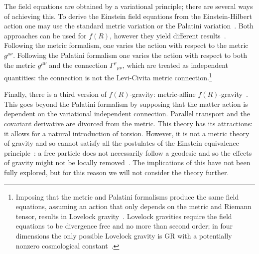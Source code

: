 \documentclass[aps,prd,amsfonts,amssymb,amsmath,nofootinbib,reprint,showpacs]{revtex4-1}
\begin{document}
The field equations are obtained by a variational principle; there are several ways of achieving this. To derive the Einstein field equations from the Einstein-Hilbert action one may use the standard metric variation or the Palatini variation~\cite{Misner1973}. Both approaches can be used for $f(R)$, however they yield different results~\cite{Sotiriou2010, DeFelice2010}. Following the metric formalism, one varies the action with respect to the metric $g^{\mu\nu}$. Following the Palatini formalism one varies the action with respect to both the metric $g^{\mu\nu}$ and the connection ${\Gamma^\rho}_{\mu\nu}$, which are treated as independent quantities: the connection is not the Levi-Civita metric connection.\footnote{Imposing that the metric and Palatini formalisms produce the same field equations, assuming an action that only depends on the metric and Riemann tensor, results in Lovelock gravity~\cite{Exirifard2008}. Lovelock gravities require the field equations to be divergence free and no more than second order; in four dimensions the only possible Lovelock gravity is GR with a potentially nonzero cosmological constant~\cite{Lovelock1970, Lovelock1971, Lovelock1972}.}

Finally, there is a third version of $f(R)$-gravity: metric-affine $f(R)$-gravity~\cite{Sotiriou2007, Sotiriou2007b}. This goes beyond the Palatini formalism by supposing that the matter action is dependent on the variational independent connection. Parallel transport and the covariant derivative are divorced from the metric. This theory has its attractions: it allows for a natural introduction of torsion. However, it is not a metric theory of gravity and so cannot satisfy all the postulates of the Einstein equivalence principle~\cite{Will2006}: a free particle does not necessarily follow a geodesic and so the effects of gravity might not be locally removed~\cite{Exirifard2008}. The implications of this have not been fully explored, but for this reason we will not consider the theory further.
\end{document}
